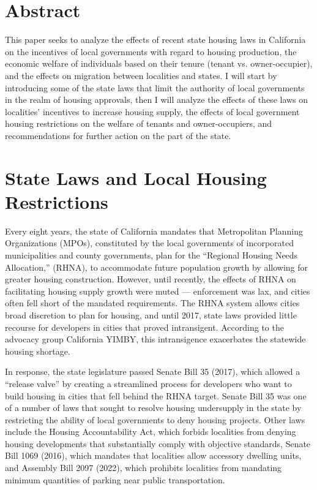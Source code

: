 \documentclass[12pt]{extarticle}
\title{}
\author{Avinash Iyer}
\date{}
\newlength\tindent
\renewcommand{\indent}{\hspace*{\tindent}}
\begin{document}
  \doublespacing
  \section*{Abstract}
  This paper seeks to analyze the effects of recent state housing laws in California on the incentives of local governments with regard to housing production, the economic welfare of individuals based on their tenure (tenant vs. owner-occupier), and the effects on migration between localities and states. I will start by introducing some of the state laws that limit the authority of local governments in the realm of housing approvals, then I will analyze the effects of these laws on localities' incentives to increase housing supply, the effects of local government housing restrictions on the welfare of tenants and owner-occupiers, and recommendations for further action on the part of the state.
  \section*{State Laws and Local Housing Restrictions}%
  Every eight years, the state of California mandates that Metropolitan Planning Organizations (MPOs), constituted by the local governments of incorporated municipalities and county governments, plan for the ``Regional Housing Needs Allocation,'' (RHNA), to accommodate future population growth by allowing for greater housing construction.\supercite{rhna} However, until recently, the effects of RHNA on facilitating housing supply growth were muted --- enforcement was lax, and cities often fell short of the mandated requirements. The RHNA system allows cities broad discretion to plan for housing, and until 2017, state laws provided little recourse for developers in cities that proved intransigent. According to the advocacy group California YIMBY, this intransigence exacerbates the statewide housing shortage.

  \indent In response, the state legislature passed Senate Bill 35 (2017), which allowed a ``release valve'' by creating a streamlined process for developers who want to build housing in cities that fell behind the RHNA target.\supercite{sb_35_423} Senate Bill 35 was one of a number of laws that sought to resolve housing undersupply in the state by restricting the ability of local governments to deny housing projects. Other laws include the Housing Accountability Act, which forbids localities from denying housing developments that substantially comply with objective standards, Senate Bill 1069 (2016), which mandates that localities allow accessory dwelling units,\supercite{sb_1069} and Assembly Bill 2097 (2022), which prohibits localities from mandating minimum quantities of parking near public transportation.\supercite{ab_2097}
\end{document}
